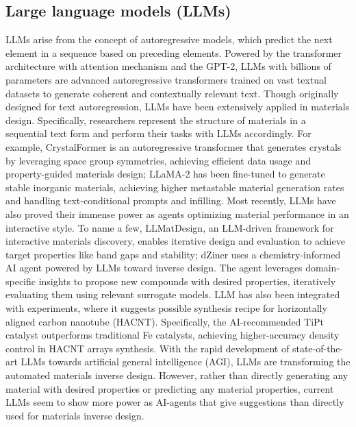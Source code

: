 \documentclass[fleqn,10pt]{wlscirep}
\begin{document}
\subsection{Large language models (LLMs)}
LLMs arise from the concept of autoregressive models, which predict the next element in a sequence based on preceding elements. Powered by the transformer architecture with attention mechanism\cite{vaswani2017attention} and the GPT-2\cite{radford2019language}, LLMs with billions of parameters are advanced autoregressive transformers trained on vast textual datasets to generate coherent and contextually relevant text. Though originally designed for text autoregression, LLMs have been extensively applied in materials design. 
Specifically, researchers represent the structure of materials in a sequential text form and perform their tasks with LLMs accordingly. For example, CrystalFormer is an autoregressive transformer that generates crystals by leveraging space group symmetries, achieving efficient data usage and property-guided materials design\cite{cao2024space}; LLaMA-2 has been fine-tuned to generate stable inorganic materials, achieving higher metastable material generation rates and handling text-conditional prompts and infilling\cite{gruver2024fine}. Most recently, LLMs have also proved their immense power as agents optimizing material performance in an interactive style. To name a few, LLMatDesign, an LLM-driven framework for interactive materials discovery, enables iterative design and evaluation to achieve target properties like band gaps and stability\cite{jia2024llmatdesign}; dZiner uses a chemistry-informed AI agent powered by LLMs  toward inverse design. The agent leverages domain-specific insights to propose new compounds with desired properties, iteratively evaluating them using relevant surrogate models\cite{ansari2024dziner}. 
LLM has also been integrated with experiments, where it suggests possible synthesis recipe for horizontally aligned carbon nanotube (HACNT). Specifically, the AI-recommended TiPt catalyst outperforms traditional Fe catalysts, achieving higher-accuracy density control in HACNT arrays synthesis\cite{li2024transforming}.
With the rapid development of state-of-the-art LLMs towards artificial general intelligence (AGI)\cite{jaech2024openai}, LLMs are transforming the automated materials inverse design. However, rather than directly generating any material with desired properties or predicting any material properties, current LLMs seem to show more power as AI-agents that give suggestions than directly used for materials inverse design. 
\end{document}
